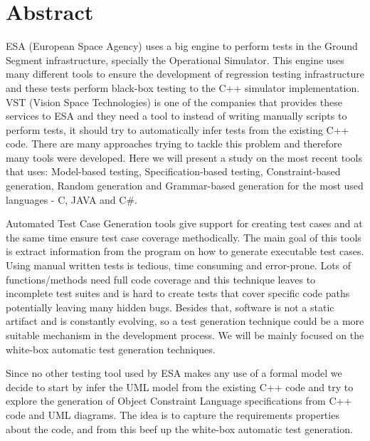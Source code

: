 \chapter*{Abstract}
ESA (European Space Agency) uses a big engine to perform tests in the
Ground Segment infrastructure, specially the Operational Simulator.
This engine uses many different tools to ensure the development of
regression testing infrastructure and these tests perform black-box
testing to the C++ simulator implementation.
VST (Vision Space Technologies) is one of the companies that provides
these services to ESA and they need a tool to instead of writing
manually scripts to perform tests, it should try to automatically
infer tests from the existing C++ code.
There are many approaches trying to tackle this problem and therefore
many tools were developed. Here we will present a study on the most
recent tools that uses: Model-based testing, Specification-based
testing, Constraint-based generation, Random generation and
Grammar-based generation for the most used languages - C, JAVA and C\#.

Automated Test Case Generation tools give support for creating test
cases and at the same time ensure test case coverage methodically. The
main goal of this tools is extract information from the program on how
to generate executable test cases.
Using manual written tests is tedious, time consuming and error-prone.
Lots of functions/methods need full code coverage and this technique
leaves to incomplete test suites and is hard to create tests that
cover specific code paths potentially leaving many hidden bugs.
Besides that, software is not a static artifact and is constantly
evolving, so a test generation technique could be a more suitable
mechanism in the development process.
We will be mainly focused on the white-box automatic test generation techniques.

Since no other testing tool used by ESA makes any use of a formal
model we decide to start by infer the UML model from the existing C++
code and try to explore the generation of Object Constraint Language specifications
from C++ code and UML diagrams. The idea is to capture the requirements properties about the code, and from this beef up the white-box automatic test generation.
